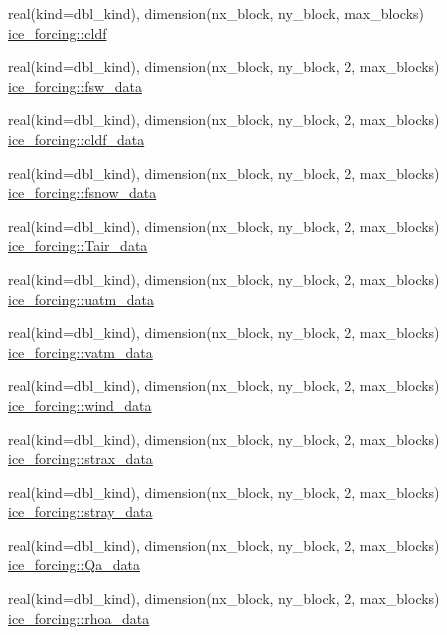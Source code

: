 \begin{DoxyCompactItemize}
\item 
real(kind=dbl\_\-kind), dimension(nx\_\-block, ny\_\-block, max\_\-blocks) \hyperlink{namespaceice__forcing_a251b0646126ab48de9758116bec0c414}{ice\_\-forcing::cldf}
\item 
real(kind=dbl\_\-kind), dimension(nx\_\-block, ny\_\-block, 2, max\_\-blocks) \hyperlink{namespaceice__forcing_a423a50a8e4373aae7be0c11fe1ab7e0f}{ice\_\-forcing::fsw\_\-data}
\item 
real(kind=dbl\_\-kind), dimension(nx\_\-block, ny\_\-block, 2, max\_\-blocks) \hyperlink{namespaceice__forcing_aa497c4b2e2bdd7e83e0b08b306c364c8}{ice\_\-forcing::cldf\_\-data}
\item 
real(kind=dbl\_\-kind), dimension(nx\_\-block, ny\_\-block, 2, max\_\-blocks) \hyperlink{namespaceice__forcing_ae97592cfaa6f6f1dfe5a12391e7f912d}{ice\_\-forcing::fsnow\_\-data}
\item 
real(kind=dbl\_\-kind), dimension(nx\_\-block, ny\_\-block, 2, max\_\-blocks) \hyperlink{namespaceice__forcing_ad7ad20c7d13ff53a459e4f18b8eeccbf}{ice\_\-forcing::Tair\_\-data}
\item 
real(kind=dbl\_\-kind), dimension(nx\_\-block, ny\_\-block, 2, max\_\-blocks) \hyperlink{namespaceice__forcing_a3e020efe327d9945b65433fa30d543ef}{ice\_\-forcing::uatm\_\-data}
\item 
real(kind=dbl\_\-kind), dimension(nx\_\-block, ny\_\-block, 2, max\_\-blocks) \hyperlink{namespaceice__forcing_a369b83c4f0776d66c624871fbb32767d}{ice\_\-forcing::vatm\_\-data}
\item 
real(kind=dbl\_\-kind), dimension(nx\_\-block, ny\_\-block, 2, max\_\-blocks) \hyperlink{namespaceice__forcing_a5b562d2a30773faba85cbae322e64162}{ice\_\-forcing::wind\_\-data}
\item 
real(kind=dbl\_\-kind), dimension(nx\_\-block, ny\_\-block, 2, max\_\-blocks) \hyperlink{namespaceice__forcing_a553d40f9acc76f1b6dc8fc56cddccf87}{ice\_\-forcing::strax\_\-data}
\item 
real(kind=dbl\_\-kind), dimension(nx\_\-block, ny\_\-block, 2, max\_\-blocks) \hyperlink{namespaceice__forcing_af5d69277a6de176e90f0b2329fef928c}{ice\_\-forcing::stray\_\-data}
\item 
real(kind=dbl\_\-kind), dimension(nx\_\-block, ny\_\-block, 2, max\_\-blocks) \hyperlink{namespaceice__forcing_aa702ee11143b22380ab015e34da2cd55}{ice\_\-forcing::Qa\_\-data}
\item 
real(kind=dbl\_\-kind), dimension(nx\_\-block, ny\_\-block, 2, max\_\-blocks) \hyperlink{namespaceice__forcing_ab950a2df7e588896b30862fc06c54496}{ice\_\-forcing::rhoa\_\-data}

\end{DoxyCompactItemize}
